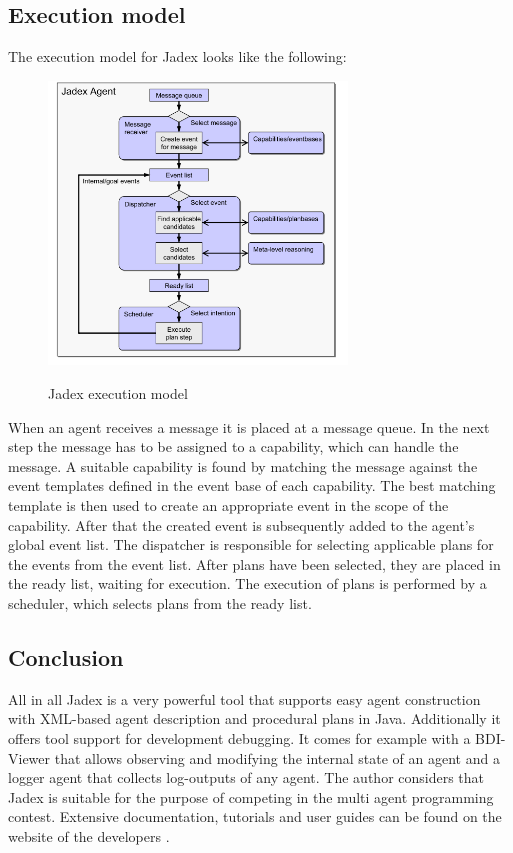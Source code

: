 \subsection{Execution model}
The execution model for Jadex looks like the following:
\begin{figure}
	\centering
	\includegraphics[width=300px]{images/Jadex_execution_model.png}
	\label{fig3}
	\caption{Jadex execution model \cite{Pokahr}}
\end{figure}
\newline
When an agent receives a message it is placed at a message queue. In the next step the message has to be assigned to a capability, which can handle the message. A suitable capability is found by matching the message against the event templates defined in the event base of each capability. The best matching template is then used to create an appropriate event in the scope of the capability. After that the created event is subsequently added to the agent's global event list. The dispatcher is responsible for selecting applicable plans for the events from the event list. After plans have been selected, they are placed in the ready list, waiting for execution. The execution of plans is performed by a scheduler, which selects plans from the ready list. 

\subsection{Conclusion}
All in all Jadex is a very powerful tool that supports easy agent construction with XML-based agent description and procedural plans in Java. Additionally it offers tool support for development debugging. It comes for example with a BDI-Viewer that allows observing and modifying the internal state of an agent and a logger agent that collects log-outputs of any agent. The author considers that Jadex is suitable for the purpose of competing in the multi agent programming contest. Extensive documentation, tutorials and user guides can be found on the website of the developers \cite{Jadex}.
